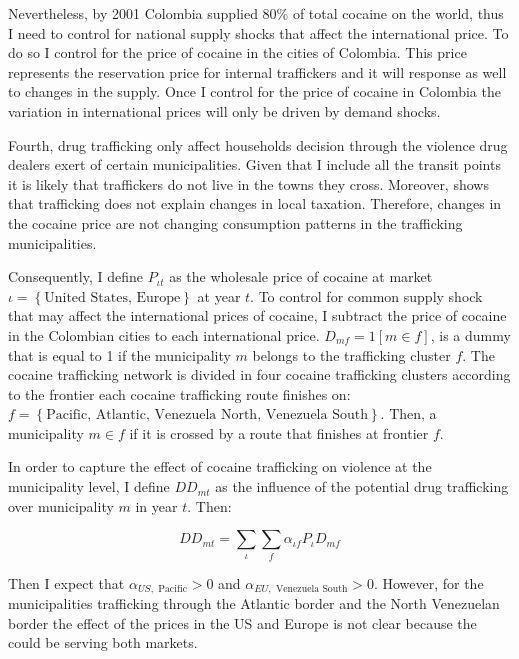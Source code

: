 \documentclass[a4paper,10pt,twocolumn,preprint,3p,authoryear]{elsarticle}
\begin{document}
Nevertheless, by 2001 Colombia supplied 80\% of total cocaine on the world, thus I need to control for national supply shocks that affect the international price. To do so I control for the price of cocaine in the cities of Colombia. This price represents the reservation price for internal traffickers and it will response as well to changes in the supply.  Once I control for the price of cocaine in Colombia the variation in international prices will only be driven by demand shocks.

Fourth, drug trafficking only affect households decision through the violence drug dealers exert of certain municipalities. Given that I include all the transit points it is likely that traffickers do not live in the towns they cross. Moreover, \citet{Millan2014Trafficking} shows that trafficking does not explain changes in local taxation. Therefore, changes in the cocaine price are not changing consumption patterns in the trafficking municipalities. %

Consequently, I define $P_{\iota t}$ as the wholesale price of cocaine at market $\iota = \left\{ \textrm{United States, Europe} \right\}$ at year $t$. To control for common supply shock that may affect the international prices of cocaine, I subtract the price of cocaine in the Colombian cities to each international price. $D_{mf} = 1\left[m \in f  \right]$, is a dummy that is equal to 1 if the municipality $m$ belongs to the trafficking cluster $f$. The cocaine trafficking network is divided in four cocaine trafficking clusters according to the frontier each cocaine trafficking route finishes on: $f = \left\{ \textrm{Pacific, Atlantic, Venezuela North, Venezuela South} \right\}$. Then, a municipality $m \in f$ if it is crossed by a route that finishes at frontier $f$.

In order to capture the effect of cocaine trafficking on violence at the municipality level, I define $DD_{mt}$ as the influence of the potential drug trafficking over municipality $m$ in year $t$. Then:

\begin{equation}
	DD_{mt} = \sum_{\iota} \sum_{f}{\alpha_{\iota f}P_{\iota}D_{mf}}
	\label{eq:DrugTrafickingDef}
\end{equation}

Then I expect that $\alpha_{US,\textrm{ Pacific}} > 0$ and $\alpha_{EU,\textrm{ Venezuela South}} > 0$. However, for the municipalities trafficking through the Atlantic border and the North Venezuelan border the effect of the prices in the US and Europe is not clear because the could be serving both markets. 
\end{document}
